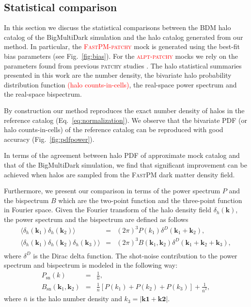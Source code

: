 \documentclass[english,usenatbib]{mn2e}
\newcommand{\tod}[1]{{\textcolor{red}{ #1}}}
\newcommand{\ba}{\begin{eqnarray}}
\newcommand{\ea}{\end{eqnarray}}
\begin{document}
\subsection{Statistical comparison}
\label{sec:stats}

In this section we discuss the statistical comparisons between the BDM halo catalog of the BigMultiDark simulation and the halo catalog generated from our method. In particular, the \tod{\textsc{FastPM}-\textsc{patchy}} mock is generated using the best-fit bias parameters (see Fig.~\ref{fig:bias}). For the \tod{\textsc{alpt}-\textsc{patchy}} mocks we rely on the parameters found from previous \textsc{patchy} studies \citep{kitaura2016}. The halo statistical summaries presented in this work are the number density, the bivariate halo probability distribution function \tod{(halo counts-in-cells)}, the real-space power spectrum and the real-space bispectrum. 

By construction our method reproduces the exact number density of halos in the reference catalog (Eq.~\ref{eq:normalization}). We observe that the bivariate PDF (or halo counts-in-cells) of the reference catalog can be reproduced with good accuracy (Fig.~\ref{fig:pdfpower}). 

In terms of the agreement between halo PDF of approximate mock catalog and that of the BigMultiDark simulation, we find that significant improvement can be achieved when halos are sampled from the \textsc{FastPM} dark matter density field. 

Furthermore, we present our comparison in terms of the power spectrum $P$ and the bispectrum $B$ which are the two-point function and the three-point function in Fourier space. Given the Fourier transform of the halo density field $\delta_{h}(\mathbf{k})$, the power spectrum and the bispectrum are defined as follows
\ba
\langle \delta_{h}(\mathbf{k}_{1}) \delta_{h}(\mathbf{k}_{2})\rangle &=& (2\pi)^{3} P(k_{1}) \delta^{D}(\mathbf{k}_{1}+\mathbf{k}_{2}), \\
\langle \delta_{h}(\mathbf{k}_{1}) \delta_{h}(\mathbf{k}_{2}) \delta_{h}(\mathbf{k}_{3})\rangle &=& (2\pi)^{3} B(\mathbf{k}_{1},\mathbf{k}_{2}) \delta^{D}(\mathbf{k}_{1}+\mathbf{k}_{2}+\mathbf{k}_{3}), \nonumber \\
\ea
where $\delta^{D}$ is the Dirac delta function. The shot-noise contribution to the power spectrum and bispectrum is modeled in the following way:
\ba
P_{\mathrm{sn}}(k) &=& \frac{1}{\bar{n}}, \\
B_{\mathrm{sn}}(\mathbf{k}_{1},\mathbf{k}_{2}) &=& \frac{1}{\bar{n}} [P(k_{1}) + P(k_{2}) + P(k_{3})] + \frac{1}{\bar{n}^{2}},
\ea
where $\bar{n}$ is the halo number density and $k_{3}=|\mathbf{k1}+\mathbf{k2}|$.
\end{document}
